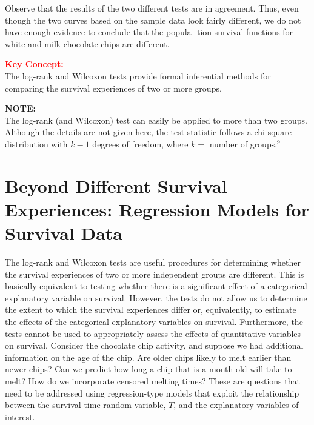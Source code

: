 \documentclass[
]{report}
\begin{document}
Observe that the results of the two different tests are in agreement. Thus, even though the two curves
based on the sample data look fairly different, we do not have enough evidence to conclude that the popula-
tion survival functions for white and milk chocolate chips are different.

\large

\textbf{\textcolor{red}{Key Concept:}}\\
\color{red}
The log-rank and Wilcoxon tests provide formal inferential methods for comparing the survival experiences of two or more groups.\\
\color{black}
\normalsize

\large

\textbf{NOTE:}\\
The log-rank (and Wilcoxon) test can easily be applied to more than two groups. Although the details are not given here, the test statistic follows a chi-square distribution with \(k - 1\) degrees of freedom, where \(k =\) number of groups.\(^9\)
\normalsize

\section*{Beyond Different Survival Experiences: Regression Models for Survival Data}\label{beyond-different-survival-experiences-regression-models-for-survival-data}

The log-rank and Wilcoxon tests are useful procedures for determining whether the survival experiences of two or more independent groups are different. This is basically equivalent to testing whether there is a significant effect of a categorical explanatory variable on survival. However, the tests do not allow us to determine the extent to which the survival experiences differ or, equivalently, to estimate the effects of the categorical explanatory variables on survival. Furthermore, the tests cannot be used to appropriately assess the effects of quantitative variables on survival. Consider the chocolate chip activity, and suppose we had additional information on the age of the chip. Are older chips likely to melt earlier than newer chips? Can we predict how long a chip that is a month old will take to melt? How do we incorporate censored melting times? These are questions that need to be addressed using regression-type models that exploit the relationship between the survival time random variable, \(T\), and the explanatory variables of interest.
\end{document}
